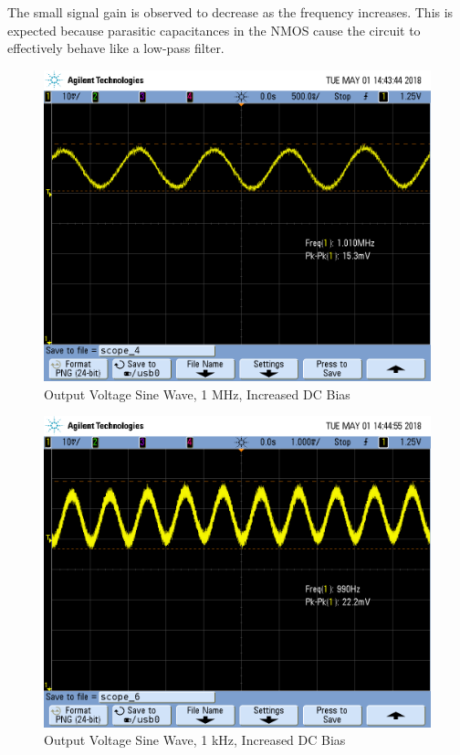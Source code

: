 \FloatBarrier

The small signal gain is observed to decrease as the frequency increases.
This is expected because parasitic capacitances in the NMOS cause the circuit to effectively behave like a low-pass filter. \\

\FloatBarrier

\begin{figure}[h!]
	\centering
	\includegraphics[scale=0.3]{./images/SCOPE_4.PNG}
	\caption{Output Voltage Sine Wave, 1 \si{\mega\hertz}, Increased DC Bias}
	\label{fig:1mhz_original}
\end{figure}

\FloatBarrier

\begin{figure}[h!]
	\centering
	\includegraphics[scale=0.3]{./images/SCOPE_6.PNG}
	\caption{Output Voltage Sine Wave, 1 \si{\kilo\hertz}, Increased DC Bias}
	\label{fig:1khz_original}
\end{figure}

